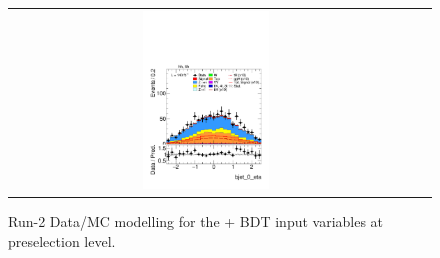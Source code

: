 \begin{figure}[htbp]
\begin{tabular}{@{}c c c@{}}
    \includegraphics[width=0.33\textwidth]{images/plots_modelling_run2_run3_variables/run_2_tth/plot_bjet_0_eta_hh_tth_15_16_17_18.pdf}
  \end{tabular}

  \caption{Run-2 Data/MC modelling for the \thqb + \ttH BDT input variables at preselection level.}
  \label{tth_vars_modelling_run3_2}
\end{figure}

